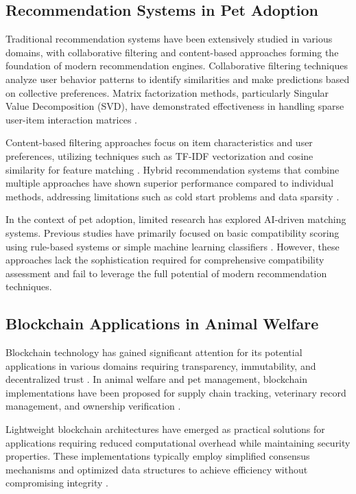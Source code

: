 \documentclass[conference]{IEEEtran}
\begin{document}
\subsection{Recommendation Systems in Pet Adoption}

Traditional recommendation systems have been extensively studied in various domains, with collaborative filtering and content-based approaches forming the foundation of modern recommendation engines. Collaborative filtering techniques analyze user behavior patterns to identify similarities and make predictions based on collective preferences. Matrix factorization methods, particularly Singular Value Decomposition (SVD), have demonstrated effectiveness in handling sparse user-item interaction matrices \cite{matrixfactor2022}.

Content-based filtering approaches focus on item characteristics and user preferences, utilizing techniques such as TF-IDF vectorization and cosine similarity for feature matching \cite{contentbased2023}. Hybrid recommendation systems that combine multiple approaches have shown superior performance compared to individual methods, addressing limitations such as cold start problems and data sparsity \cite{hybrid2024}.

In the context of pet adoption, limited research has explored AI-driven matching systems. Previous studies have primarily focused on basic compatibility scoring using rule-based systems or simple machine learning classifiers \cite{petmatching2022}. However, these approaches lack the sophistication required for comprehensive compatibility assessment and fail to leverage the full potential of modern recommendation techniques.

\subsection{Blockchain Applications in Animal Welfare}

Blockchain technology has gained significant attention for its potential applications in various domains requiring transparency, immutability, and decentralized trust \cite{blockchain2023}. In animal welfare and pet management, blockchain implementations have been proposed for supply chain tracking, veterinary record management, and ownership verification \cite{animalblock2024}.

Lightweight blockchain architectures have emerged as practical solutions for applications requiring reduced computational overhead while maintaining security properties. These implementations typically employ simplified consensus mechanisms and optimized data structures to achieve efficiency without compromising integrity \cite{lightweight2023}.
\end{document}
